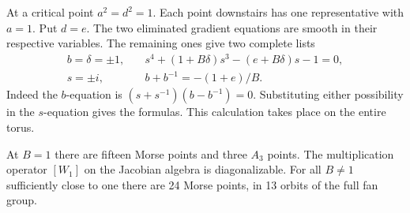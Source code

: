 At a critical point $a^2=d^2=1$. Each point downstairs has one representative with $a=1$. Put $d=e$. The two eliminated gradient equations are smooth in their respective variables. The remaining ones give two complete lists
\begin{align}
 b=\delta=\pm1,\quad & s^4+(1+B\delta)s^3-(e+B\delta)s-1=0, \label{eq:regular}\\
 s=\pm i,\quad & b+b^{-1}=-(1+e)/B . \label{eq:exceptional}
\end{align}
Indeed the $b$-equation is $(s+s^{-1})(b-b^{-1})=0$. Substituting either possibility in the $s$-equation gives the formulas. This calculation takes place on the entire torus.

\begin{proposition}
At $B=1$ there are fifteen Morse points and three $A_3$ points. The multiplication operator $[W_1]$ on the Jacobian algebra is diagonalizable. For all $B\ne1$ sufficiently close to one there are 24 Morse points, in 13 orbits of the full fan group.
\end{proposition}
